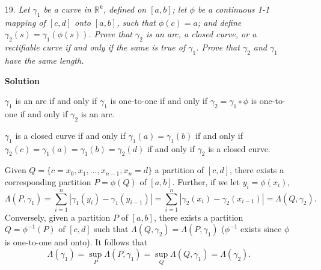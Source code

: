 \documentclass{article}
\begin{document}
\begin{enumerate}
\begin{itemize}
\item[19.] {\em Let \(\gamma_1\) be a curve in \(\mathbb{R}^k\), defined on \([a,b]\); let \(\phi\) be a continuous 1-1 mapping of \([c,d]\) onto \([a,b]\), such that \(\phi(c) = a\); and define \(\gamma_2(s) = \gamma_1(\phi(s))\).  Prove that \(\gamma_2\) is an arc, a closed curve, or a rectifiable curve if and only if the same is true of \(\gamma_1\).  Prove that \(\gamma_2\) and \(\gamma_1\) have the same length.}

{\bf Solution}

\(\gamma_1\) is an arc if and only if \(\gamma_1\) is one-to-one if and only if \(\gamma_2 = \gamma_1 \circ \phi\) is one-to-one if and only if \(\gamma_2\) is an arc.

\(\gamma_1\) is a closed curve if and only if \(\gamma_1(a) = \gamma_1(b)\) if and only if \(\gamma_2(c) = \gamma_1(a) = \gamma_1(b) = \gamma_2(d)\) if and only if \(\gamma_2\) is a closed curve.

Given \(Q = \{c = x_0, x_1, \ldots, x_{n - 1}, x_n = d\}\) a partition of \([c,d]\), there exists a corresponding partition \(P = \phi(Q)\) of \([a,b]\).  Further, if we let \(y_i = \phi(x_i)\),
\[\Lambda(P,\gamma_1) = \sum_{i = 1}^n \left| \gamma_1(y_i) - \gamma_1(y_{i - 1}) \right|
                      = \sum_{i = 1}^n \left| \gamma_2(x_i) - \gamma_2(x_{i - 1}) \right| = \Lambda(Q,\gamma_2).\]
Conversely, given a partition \(P\) of \([a,b]\), there exists a partition \(Q = \phi^{-1}(P)\) of \([c,d]\) such that \(\Lambda(Q,\gamma_2) = \Lambda(P,\gamma_1)\) (\(\phi^{-1}\) exists since \(\phi\) is one-to-one and onto).  It follows that
\[\Lambda(\gamma_1) = \sup_P \Lambda(P,\gamma_1) = \sup_Q \Lambda(Q,\gamma_1) = \Lambda(\gamma_2).\]



\end{itemize}



\end{enumerate}
\end{document}
